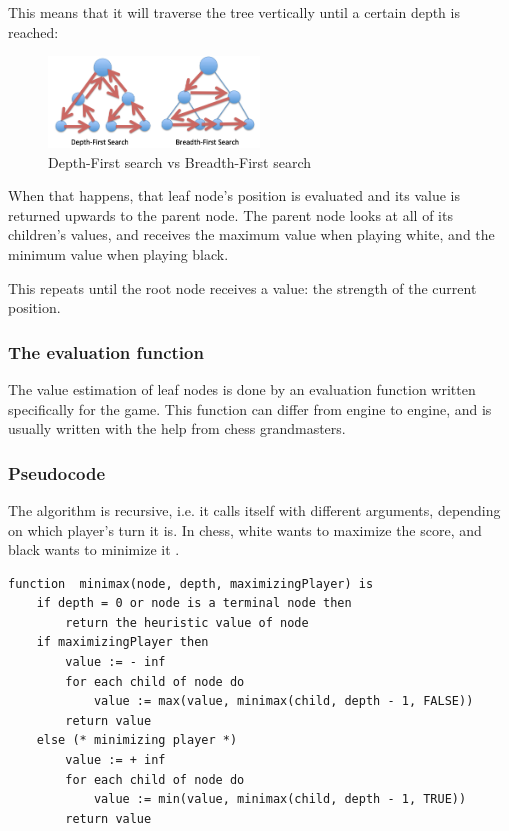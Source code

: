 \documentclass{article}
\begin{document}
This means that it will traverse the tree vertically until a certain depth is reached:

\begin{figure}[H]
    \centering
    \includegraphics[width=0.5\textwidth]{img/depth-vs-breadth.png}
    \caption{Depth-First search vs Breadth-First search \cite{eppesHowComputerizedChess2019}}
\end{figure}

When that happens, that leaf node's position is evaluated and its value is returned
upwards to the parent node. The parent node looks at all of its children's values, 
and receives the maximum value when playing white, and the minimum value
when playing black. 

This repeats until the root node receives a value: the strength of the current position.

\subsubsection{The evaluation function}

The value estimation of leaf nodes is done by an evaluation function \cite{EvaluationFunction2022} written specifically
for the game. This function can differ from engine to engine, and is usually written with the
help from chess grandmasters. 

\subsubsection{Pseudocode}

The algorithm is recursive, i.e. it calls itself with different arguments, depending
on which player's turn it is. In chess, white wants to maximize the score, and 
black wants to minimize it \cite{Minimax2022}. 

\begin{verbatim}
function  minimax(node, depth, maximizingPlayer) is
    if depth = 0 or node is a terminal node then
        return the heuristic value of node
    if maximizingPlayer then
        value := - inf
        for each child of node do
            value := max(value, minimax(child, depth - 1, FALSE))
        return value
    else (* minimizing player *)
        value := + inf
        for each child of node do
            value := min(value, minimax(child, depth - 1, TRUE))
        return value
\end{verbatim}
\end{document}
